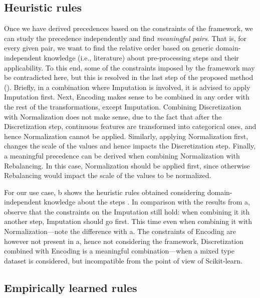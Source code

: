 \subsection{Heuristic rules}
\label{effective-ssec:rules-heuristics}
Once we have derived precedences based on the constraints of the framework, we can study the precedence independently and find \textit{meaningful pairs}.
That is, for every given pair, we want to find the relative order based on generic domain-independent knowledge (i.e., literature) about pre-processing steps and their applicability.
To this end, some of the constraints imposed by the framework may be contradicted here, but this is resolved in the last step of the proposed method
().
Briefly, in a combination where Imputation is involved, it is advised to apply Imputation first.
Next, Encoding makes sense to be combined in any order with the rest of the transformations, except Imputation.
Combining Discretization with Normalization does not make sense, due to the fact that after the Discretization step, continuous features are transformed into categorical ones, and hence Normalization cannot be applied.
Similarly, applying Normalization first, changes the scale of the values and hence impacts the Discretization step.
Finally, a meaningful precedence can be derived when combining Normalization with Rebalancing.
In this case, Normalization should be applied first, since otherwise Rebalancing would impact the scale of the values to be normalized.

\begin{example}
For our use case, b shows the heuristic rules obtained considering domain-independent knowledge about the steps \cite{BookExploratoryDM03Dasu}.
In comparison with the results from a, observe that the constraints on the Imputation still hold: when combining it ith another step, Imputation should go first.
This time even when combining it with Normalization---note the difference with a.
The constraints of Encoding are however not present in a, hence not considering the framework, Discretization combined with Encoding is a meaningful combination---when a mixed type dataset is considered, but incompatible from the point of view of Scikit-learn.
\end{example}

\subsection{Empirically learned rules}
\label{effective-ssec:rules-learned}

